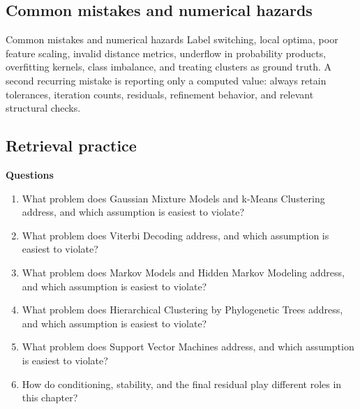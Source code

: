 \documentclass[10pt,letterpaper]{article}
\begin{document}
\subsection*{Common mistakes and numerical hazards}
\begin{warnbox}{Common mistakes and numerical hazards}
Label switching, local optima, poor feature scaling, invalid distance metrics, underflow in probability products, overfitting kernels, class imbalance, and treating clusters as ground truth.  A second recurring mistake is reporting only a computed value: always retain tolerances, iteration counts, residuals, refinement behavior, and relevant structural checks.
\end{warnbox}

\subsection*{Retrieval practice}
\textbf{Questions}
\begin{enumerate}
\item What problem does Gaussian Mixture Models and k-Means Clustering address, and which assumption is easiest to violate?
\item What problem does Viterbi Decoding address, and which assumption is easiest to violate?
\item What problem does Markov Models and Hidden Markov Modeling address, and which assumption is easiest to violate?
\item What problem does Hierarchical Clustering by Phylogenetic Trees address, and which assumption is easiest to violate?
\item What problem does Support Vector Machines address, and which assumption is easiest to violate?
\item How do conditioning, stability, and the final residual play different roles in this chapter?
\end{enumerate}
\end{document}
